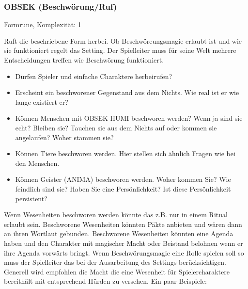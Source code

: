 \documentclass{article}
\begin{document}
\subsubsection{OBSEK (Beschwörung/Ruf)}

Formrune, Komplexität: 1

Ruft die beschriebene Form herbei. Ob Beschwöreungsmagie erlaubt ist und wie sie funktioniert regelt das Setting.
Der Spielleiter muss für seine Welt mehrere Entscheidungen treffen wie Beschwörung funktioniert.

\begin{itemize}
\item Dürfen Spieler und einfache Charaktere herbeirufen?
\item Erscheint ein beschworener Gegenstand aus dem Nichts. Wie real ist er wie lange existiert er?
\item Können Menschen mit OBSEK HUMI beschworen werden? Wenn ja sind sie echt? Bleiben sie? Tauchen sie aus dem Nichts auf oder kommen sie angelaufen? Woher stammen sie?
\item Können Tiere beschworen werden. Hier stellen sich ähnlich Fragen wie bei den Menschen.
\item Können Geister (ANIMA) beschworen werden. Woher kommen Sie? Wie feindlich sind sie? Haben Sie eine Persönlichkeit? Ist diese Persönlichkeit persistent?
\end{itemize}

Wenn Wesenheiten beschworen werden könnte das z.B. nur in einem Ritual erlaubt sein. Beschworene Wesenheiten könnten
Päkte anbieten und wären dann an ihren Wortlaut gebunden. Beschworene Wesenheiten könnten eine Agenda haben und den
Charakter mit magischer Macht oder Beistand belohnen wenn er ihre Agenda vorwärts bringt. Wenn Beschwörungsmagie eine
Rolle spielen soll so muss der Spielleiter das bei der Ausarbeitung des Settings berücksichtigen. Generell wird
empfohlen die Macht die eine Wesenheit für Spielercharaktere bereithält mit entsprechend Hürden zu versehen. Ein
paar Beispiele:
\end{document}
